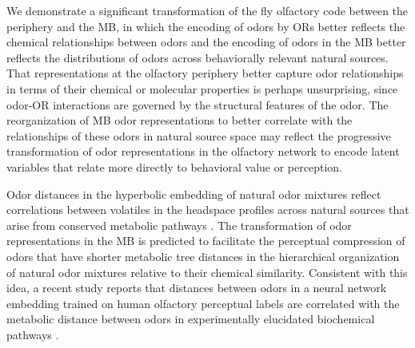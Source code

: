 \documentclass[12pt]{caltech_thesis}
\renewcommand{\cite}{{ }\autocite}
\begin{document}
\begin{refsection}
We demonstrate a significant transformation of the fly olfactory code between the periphery and the MB, in which the encoding of odors by ORs better reflects the chemical relationships between odors and the encoding of odors in the MB better reflects the distributions of odors across behaviorally relevant natural sources.
That representations at the olfactory periphery better capture odor relationships in terms of their chemical or molecular properties is perhaps unsurprising, since odor-OR interactions are governed by the structural features of the odor.
The reorganization of MB odor representations to better correlate with the relationships of these odors in natural source space may reflect the progressive transformation of odor representations in the olfactory network to encode latent variables that relate more directly to behavioral value or perception.

Odor distances in the hyperbolic embedding of natural odor mixtures reflect correlations between volatiles in the headspace profiles across natural sources that arise from conserved metabolic pathways\cite{HyperbolicOdors}.
The transformation of odor representations in the MB is predicted to facilitate the perceptual compression of odors that have shorter metabolic tree distances in the hierarchical organization of natural odor mixtures relative to their chemical similarity.
Consistent  with this idea, a recent study reports that distances between odors in a neural network embedding trained on human olfactory perceptual labels are correlated with the metabolic distance between odors in experimentally elucidated biochemical pathways\cite{MetabolicActivityRepresentations}.


\end{refsection}
\end{document}
